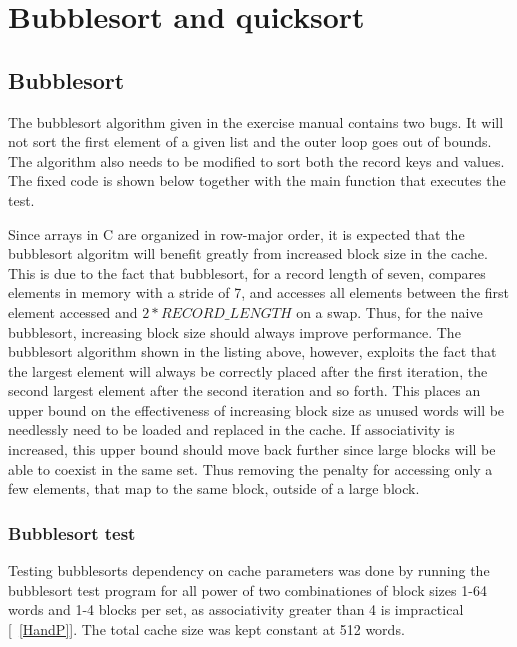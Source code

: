 \section{Bubblesort and quicksort}

\subsection{Bubblesort}
The bubblesort algorithm given in the exercise manual contains two bugs. It will not sort the first element of a given list and the 
outer loop goes out of bounds. The algorithm also needs to be modified to sort both the record keys and values. 
The fixed code is shown below together with the main function that executes the test.

Since arrays in C are organized in row-major order, it is expected that the bubblesort algoritm will benefit greatly from increased
block size in the cache. This is due to the fact that bubblesort, for a record length of seven, compares elements in memory with a 
stride of 7, and accesses all elements between the first element accessed and \(2*RECORD\_LENGTH\) on a swap. Thus, for the naive
bubblesort, increasing block size should always improve performance. The bubblesort algorithm shown in the listing above, however, 
exploits the fact that the largest element will always be correctly placed after the first iteration, the second largest element
after the second iteration and so forth. This places an upper bound on the effectiveness of increasing block size as unused words
will be needlessly need to be loaded and replaced in the cache. If associativity is increased, this upper bound should move back
further since large blocks will be able to coexist in the same set. Thus removing the penalty for accessing only a few 
elements, that map to the same block, outside of a large block.

\subsubsection{Bubblesort test}
Testing bubblesorts dependency on cache parameters was done by running the bubblesort test program for all power of two combinationes
of block sizes 1-64 words and 1-4 blocks per set, as associativity greater than 4 is impractical [~\ref{HandP}]. The total cache size
was kept constant at 512 words.

